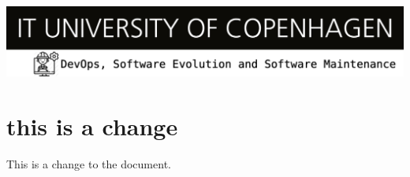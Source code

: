 \documentclass{article}
\begin{document}
  \includegraphics[width=1\linewidth]{images/devops-banner.png}
  \section{this is a change}
  This is a change to the document.
  
\end{document}
